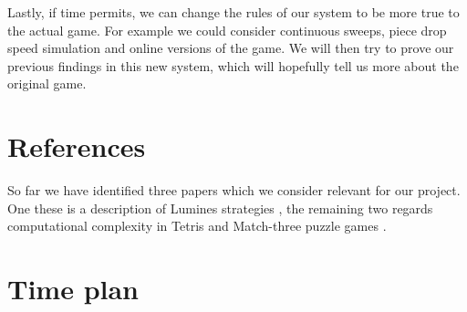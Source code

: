 \documentclass[a4paper,10pt]{article}
\begin{document}
Lastly, if time permits, we can change the rules of our system to be more true to the actual game. For example we could consider continuous sweeps, piece drop speed simulation and online versions of the game. We will then try to prove our previous findings in this new system, which will hopefully tell us more about the original game.

\section{References}
So far we have identified three papers which we consider relevant for our project. One these is a description of Lumines strategies \cite{lumines}, the remaining two regards computational complexity in Tetris \cite{tetris} and Match-three puzzle games \cite{candy}.

\section{Time plan}

\printbibliography
\end{document}
